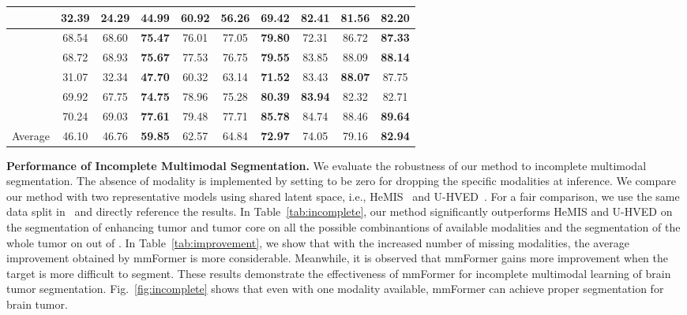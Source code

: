 \documentclass[runningheads]{llncs}
\begin{document}
\begin{table*}[!tp]
{\begin{tabular}{cccc|ccc|ccc|ccc}
 & & &               & 32.39        & 24.29     & \textbf{44.99} & 60.92  & 56.26 & \textbf{69.42}   & \textbf{82.41}  & 81.56  & 82.20       \\ \hline
 & & &               & 68.54        & 68.60     & \textbf{75.47} & 76.01  & 77.05 & \textbf{79.80}  & 72.31 & 86.72  & \textbf{87.33}       \\ \hline
 & & &               & 68.72        & 68.93     & \textbf{75.67} & 77.53  & 76.75 & \textbf{79.55}  & 83.85  & 88.09  & \textbf{88.14}       \\ \hline
 & & &               & 31.07        & 32.34     & \textbf{47.70} & 60.32  & 63.14 & \textbf{71.52}  & 83.43  & \textbf{88.07}  & 87.75       \\ \hline
 & & &               & 69.92        & 67.75     & \textbf{74.75}  & 78.96 & 75.28 & \textbf{80.39}  & \textbf{83.94}  & 82.32  & 82.71      \\ \hline
 & & &        & 70.24       & 69.03   & \textbf{77.61}     & 79.48  & 77.71  & \textbf{85.78}  & 84.74  & 88.46  & \textbf{89.64}      \\ \hline
\multicolumn{4}{c|}{Average}        & 46.10       & 46.76   & \textbf{59.85}     & 62.57  & 64.84  & \textbf{72.97}  & 74.05  & 79.16  & \textbf{82.94}      \\ \bottomrule
\end{tabular}}
\end{table*}



\noindent\textbf{Performance of Incomplete Multimodal Segmentation.}
We evaluate the robustness of our method to incomplete multimodal segmentation. The absence of modality is implemented by setting  to be zero for dropping the specific modalities at inference.
We compare our method with two representative models using shared latent space, i.e., HeMIS~\cite{havaei2016hemis} and U-HVED~\cite{dorent2019hetero}.
For a fair comparison, we use the same data split in~\cite{wang2021acn} and directly reference the results. 
In Table~\ref{tab:incomplete}, our method significantly outperforms HeMIS and U-HVED on the segmentation of enhancing tumor and tumor core on all the  possible combinantions of available modalities and the segmentation of the whole tumor on  out of . 
In Table~\ref{tab:improvement}, we show that with the increased number of missing modalities, the average improvement obtained by mmFormer is more considerable. Meanwhile, it is observed that mmFormer gains more improvement when the target is more difficult to segment. These results demonstrate the effectiveness of mmFormer for incomplete multimodal learning of brain tumor segmentation.
Fig.~\ref{fig:incomplete} shows that even with one modality available, mmFormer can achieve proper segmentation for brain tumor.
\end{document}
